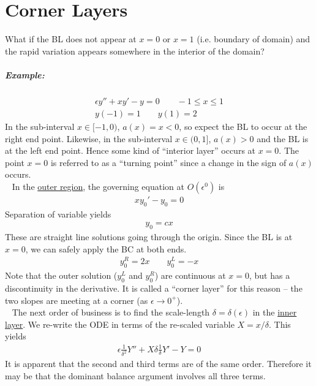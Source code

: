 \chapter{Corner Layers}
What if the BL does not appear at $x=0$ or $x=1$ (i.e. boundary of domain) and the rapid variation appears somewhere in the interior of the domain?

\paragraph{Example:} 
\begin{gather*}
	\epsilon y'' + xy' - y = 0 \qquad -1\leq x \leq 1 \\
	y(-1) = 1 \qquad y(1) = 2
\end{gather*}
In the sub-interval $x \in [-1,0)$, $a(x)=x<0$, so expect the BL to occur at the right end point. Likewise, in the sub-interval $x \in (0,1]$, $a(x)>0$ and the BL is at the left end point. Hence some kind of ``interior layer'' occurs at $x=0$. The point $x=0$ is referred to as a ``turning point'' since a change in the sign of $a(x)$ occurs. \\
\ \newline
In the \underline{outer region}, the governing equation at $O(\epsilon^0)$ is
\begin{gather*}
	xy_0' - y_0 = 0
\end{gather*}
Separation of variable yields
\begin{gather*}
	y_0 = cx
\end{gather*}
These are straight line solutions going through the origin. Since the BL is at $x=0$, we can safely apply the BC at both ends. 
\begin{align*}
	y_0^R = 2x \qquad y_0^L = -x
\end{align*}
Note that the outer solution ($y^L_0$ and $y^R_0$) are continuous at $x=0$, but has a discontinuity in the derivative. It is called a ``corner layer'' for this reason -- the two slopes are meeting at a corner (as $\epsilon \rightarrow 0^+$). \\
\ \newline
The next order of business is to find the scale-length $\delta = \delta(\epsilon)$ in the \underline{inner layer}. We re-write the ODE in terms of the re-scaled variable $X = x/\delta$. This yields
\begin{gather*}
	\epsilon \frac{1}{\delta^2} Y'' + X\delta \frac{1}{\delta} Y' - Y = 0
\end{gather*}
It is apparent that the second and third terms are of the same order. Therefore it may be that the dominant balance argument involves all three terms.
